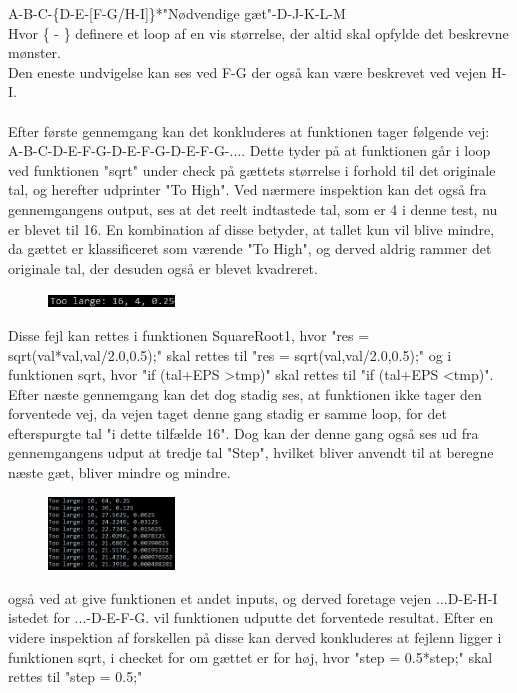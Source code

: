\documentclass[11pt]{article}
\begin{document}
    A-B-C-\{D-E-[F-G/H-I]\}*"Nødvendige gæt"-D-J-K-L-M\\
    Hvor \{ - \} definere et loop af en vis størrelse, der altid skal opfylde det beskrevne mønster.\\
    Den eneste undvigelse kan ses ved F-G der også kan være beskrevet ved vejen H-I.\\
    \\
    Efter første gennemgang kan det konkluderes at funktionen tager følgende vej:\\
    A-B-C-D-E-F-G-D-E-F-G-D-E-F-G-.... Dette tyder på at funktionen går i loop ved funktionen "sqrt" under check på gættets størrelse i forhold til det originale tal, og herefter udprinter "To High".
    Ved nærmere inspektion kan det også fra gennemgangens output, ses at det reelt indtastede tal, som er 4 i denne test, nu er blevet til 16. En kombination af disse betyder, at tallet kun vil blive mindre, da gættet er klassificeret som værende "To High", og derved aldrig rammer det originale tal, der desuden også er blevet kvadreret.
    \begin{figure}[H]
        \includegraphics[width=0.3\textwidth,angle=0]{Struktureret_System_Udvikling/Workshop_3/Udklip.PNG}
        \label{fig:Udklip}
    \end{figure}
    \noindent
    Disse fejl kan rettes i funktionen SquareRoot1, hvor "res = sqrt(val*val,val/2.0,0.5);" skal rettes til "res = sqrt(val,val/2.0,0.5);" og i funktionen sqrt, hvor "if (tal+EPS \textgreater tmp)" skal rettes til "if (tal+EPS \textless tmp)".
    Efter næste gennemgang kan det dog stadig ses, at funktionen ikke tager den forventede vej, da vejen taget denne gang stadig er samme loop, for det efterspurgte tal "i dette tilfælde 16". Dog kan der denne gang også ses ud fra gennemgangens udput at tredje tal "Step", hvilket bliver anvendt til at beregne næste gæt, bliver mindre og mindre.
    \begin{figure}[H]
        \includegraphics[width=0.3\textwidth,angle=0]{Struktureret_System_Udvikling/Workshop_3/Udklip2.PNG}
        \label{fig:Udklip2}
    \end{figure}
    \noindent
    også ved at give funktionen et andet inputs, og derved foretage vejen ...D-E-H-I istedet for ...-D-E-F-G. vil funktionen udputte det forventede resultat.
    Efter en videre inspektion af forskellen på disse kan derved konkluderes at fejlenn ligger i funktionen sqrt, i checket for om gættet er for høj, hvor "step = 0.5*step;" skal rettes til "step = 0.5;"
    
\end{document}
